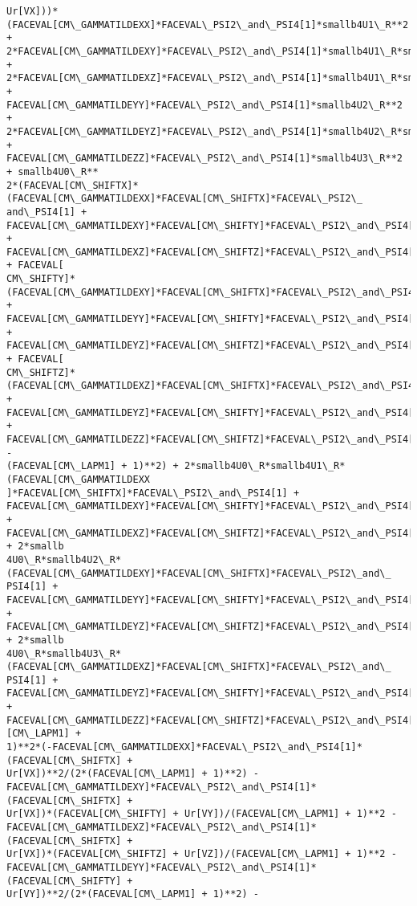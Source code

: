 \documentclass[landscape,letterpaper,10pt,english]{article}
\begin{document}
\begin{Verbatim}[commandchars=\\\{\}]
Ur[VX]))*(FACEVAL[CM\_GAMMATILDEXX]*FACEVAL\_PSI2\_and\_PSI4[1]*smallb4U1\_R**2 +
2*FACEVAL[CM\_GAMMATILDEXY]*FACEVAL\_PSI2\_and\_PSI4[1]*smallb4U1\_R*smallb4U2\_R +
2*FACEVAL[CM\_GAMMATILDEXZ]*FACEVAL\_PSI2\_and\_PSI4[1]*smallb4U1\_R*smallb4U3\_R +
FACEVAL[CM\_GAMMATILDEYY]*FACEVAL\_PSI2\_and\_PSI4[1]*smallb4U2\_R**2 +
2*FACEVAL[CM\_GAMMATILDEYZ]*FACEVAL\_PSI2\_and\_PSI4[1]*smallb4U2\_R*smallb4U3\_R +
FACEVAL[CM\_GAMMATILDEZZ]*FACEVAL\_PSI2\_and\_PSI4[1]*smallb4U3\_R**2 + smallb4U0\_R**
2*(FACEVAL[CM\_SHIFTX]*(FACEVAL[CM\_GAMMATILDEXX]*FACEVAL[CM\_SHIFTX]*FACEVAL\_PSI2\_
and\_PSI4[1] +
FACEVAL[CM\_GAMMATILDEXY]*FACEVAL[CM\_SHIFTY]*FACEVAL\_PSI2\_and\_PSI4[1] +
FACEVAL[CM\_GAMMATILDEXZ]*FACEVAL[CM\_SHIFTZ]*FACEVAL\_PSI2\_and\_PSI4[1]) + FACEVAL[
CM\_SHIFTY]*(FACEVAL[CM\_GAMMATILDEXY]*FACEVAL[CM\_SHIFTX]*FACEVAL\_PSI2\_and\_PSI4[1]
+ FACEVAL[CM\_GAMMATILDEYY]*FACEVAL[CM\_SHIFTY]*FACEVAL\_PSI2\_and\_PSI4[1] +
FACEVAL[CM\_GAMMATILDEYZ]*FACEVAL[CM\_SHIFTZ]*FACEVAL\_PSI2\_and\_PSI4[1]) + FACEVAL[
CM\_SHIFTZ]*(FACEVAL[CM\_GAMMATILDEXZ]*FACEVAL[CM\_SHIFTX]*FACEVAL\_PSI2\_and\_PSI4[1]
+ FACEVAL[CM\_GAMMATILDEYZ]*FACEVAL[CM\_SHIFTY]*FACEVAL\_PSI2\_and\_PSI4[1] +
FACEVAL[CM\_GAMMATILDEZZ]*FACEVAL[CM\_SHIFTZ]*FACEVAL\_PSI2\_and\_PSI4[1]) -
(FACEVAL[CM\_LAPM1] + 1)**2) + 2*smallb4U0\_R*smallb4U1\_R*(FACEVAL[CM\_GAMMATILDEXX
]*FACEVAL[CM\_SHIFTX]*FACEVAL\_PSI2\_and\_PSI4[1] +
FACEVAL[CM\_GAMMATILDEXY]*FACEVAL[CM\_SHIFTY]*FACEVAL\_PSI2\_and\_PSI4[1] +
FACEVAL[CM\_GAMMATILDEXZ]*FACEVAL[CM\_SHIFTZ]*FACEVAL\_PSI2\_and\_PSI4[1]) + 2*smallb
4U0\_R*smallb4U2\_R*(FACEVAL[CM\_GAMMATILDEXY]*FACEVAL[CM\_SHIFTX]*FACEVAL\_PSI2\_and\_
PSI4[1] + FACEVAL[CM\_GAMMATILDEYY]*FACEVAL[CM\_SHIFTY]*FACEVAL\_PSI2\_and\_PSI4[1] +
FACEVAL[CM\_GAMMATILDEYZ]*FACEVAL[CM\_SHIFTZ]*FACEVAL\_PSI2\_and\_PSI4[1]) + 2*smallb
4U0\_R*smallb4U3\_R*(FACEVAL[CM\_GAMMATILDEXZ]*FACEVAL[CM\_SHIFTX]*FACEVAL\_PSI2\_and\_
PSI4[1] + FACEVAL[CM\_GAMMATILDEYZ]*FACEVAL[CM\_SHIFTY]*FACEVAL\_PSI2\_and\_PSI4[1] +
FACEVAL[CM\_GAMMATILDEZZ]*FACEVAL[CM\_SHIFTZ]*FACEVAL\_PSI2\_and\_PSI4[1]))/((FACEVAL
[CM\_LAPM1] +
1)**2*(-FACEVAL[CM\_GAMMATILDEXX]*FACEVAL\_PSI2\_and\_PSI4[1]*(FACEVAL[CM\_SHIFTX] +
Ur[VX])**2/(2*(FACEVAL[CM\_LAPM1] + 1)**2) -
FACEVAL[CM\_GAMMATILDEXY]*FACEVAL\_PSI2\_and\_PSI4[1]*(FACEVAL[CM\_SHIFTX] +
Ur[VX])*(FACEVAL[CM\_SHIFTY] + Ur[VY])/(FACEVAL[CM\_LAPM1] + 1)**2 -
FACEVAL[CM\_GAMMATILDEXZ]*FACEVAL\_PSI2\_and\_PSI4[1]*(FACEVAL[CM\_SHIFTX] +
Ur[VX])*(FACEVAL[CM\_SHIFTZ] + Ur[VZ])/(FACEVAL[CM\_LAPM1] + 1)**2 -
FACEVAL[CM\_GAMMATILDEYY]*FACEVAL\_PSI2\_and\_PSI4[1]*(FACEVAL[CM\_SHIFTY] +
Ur[VY])**2/(2*(FACEVAL[CM\_LAPM1] + 1)**2) -

\end{Verbatim}
\end{document}
